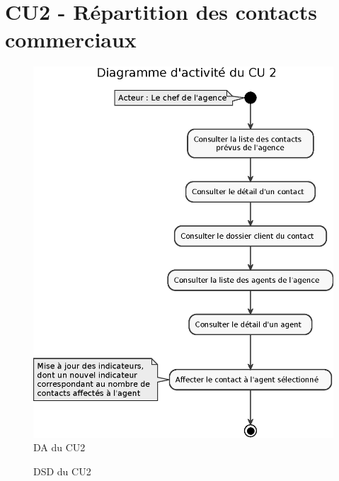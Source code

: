 \clearpage
\section{CU2 - Répartition des contacts commerciaux}

\begin{figure}[H]
\centering
\includegraphics[width=\textwidth]{figures/eps/DA_CU2.eps}
\caption{DA du CU2}
\end{figure}


\begin{figure}[H]
\noindent{}
\caption{DSD du CU2}
\end{figure}


